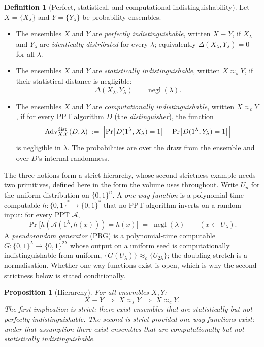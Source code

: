 \documentclass[11pt,a4paper]{article}
\newtheorem{proposition}[theorem]{Proposition}
\theoremstyle{definition}
\newtheorem{definition}[theorem]{Definition}
\theoremstyle{remark}
\DeclareMathOperator{\negl}{negl}
\begin{document}
\begin{definition}[Perfect, statistical, and computational
indistinguishability]\label{model:def:indist}
Let \(X = \{X_\lambda\}\) and \(Y = \{Y_\lambda\}\) be probability
ensembles.
\begin{itemize}
\item The ensembles \(X\) and \(Y\) are \emph{perfectly
  indistinguishable}, written
  \(X \equiv Y\), if \(X_\lambda\) and \(Y_\lambda\) are
  \emph{identically distributed} for every \(\lambda\); equivalently
  \(\Delta(X_\lambda, Y_\lambda) = 0\) for all \(\lambda\).
\item The ensembles \(X\) and \(Y\) are \emph{statistically
  indistinguishable}, written \(X \approx_s Y\), if their
  statistical distance is negligible:
  \[
    \Delta(X_\lambda, Y_\lambda) \;=\; \negl(\lambda).
  \]
\item The ensembles \(X\) and \(Y\) are \emph{computationally
  indistinguishable}, written \(X \approx_c Y\), if for every PPT
  algorithm \(D\) (the \emph{distinguisher}), the function
  \[
    \mathrm{Adv}^{\mathrm{dist}}_{X,Y}(D, \lambda)
    \;:=\; \Bigl| \Pr\bigl[D(1^\lambda, X_\lambda) = 1\bigr]
                 - \Pr\bigl[D(1^\lambda, Y_\lambda) = 1\bigr] \Bigr|
  \]
  is negligible in \(\lambda\). The probabilities are over the draw
  from the ensemble and over \(D\)'s internal randomness.
\end{itemize}
\end{definition}

The three notions form a strict hierarchy, whose second strictness
example needs two primitives, defined here in the form the volume uses
throughout. Write \(U_n\) for the uniform distribution on
\(\{0,1\}^n\). A \emph{one-way function} is a polynomial-time
computable \(h \colon \{0,1\}^* \to \{0,1\}^*\) that no PPT algorithm
inverts on a random input: for every PPT \(\mathcal{A}\),
\[
  \Pr\bigl[h(\mathcal{A}(1^\lambda, h(x))) = h(x)\bigr]
  \;=\; \negl(\lambda)
  \qquad (x \gets U_\lambda).
\]
A \emph{pseudorandom generator} (PRG) is a polynomial-time computable
\(G \colon \{0,1\}^\lambda \to \{0,1\}^{2\lambda}\) whose output on a
uniform seed is computationally indistinguishable from uniform,
\(\{G(U_\lambda)\} \approx_c \{U_{2\lambda}\}\); the doubling stretch
is a normalisation. Whether one-way functions exist is open, which is
why the second strictness below is stated conditionally.

\begin{proposition}[Hierarchy]\label{model:prop:hierarchy}
For all ensembles \(X, Y\)\textup{:}
\[
  X \equiv Y \;\Longrightarrow\; X \approx_s Y
  \;\Longrightarrow\; X \approx_c Y .
\]
The first implication is strict: there exist ensembles that are
statistically but not perfectly indistinguishable. The second is
strict provided one-way functions exist: under that assumption there
exist ensembles that are computationally but not statistically
indistinguishable.
\end{proposition}
\end{document}
